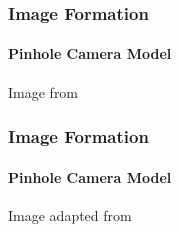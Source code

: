 \documentclass[xetex,professionalfont]{beamer}
\begin{document}
\begin{frame}
\frametitle{Image Formation}
\framesubtitle{Pinhole Camera Model}

\bigskip
\begin{center}
    {\centering Image from \cite{szeliski2010}}
\end{center}

\end{frame}


\begin{frame}
\frametitle{Image Formation}
\framesubtitle{Pinhole Camera Model}

\bigskip
\begin{center}
    {\centering Image adapted from \cite{prince12}}
\end{center}

\end{frame}

\end{document}
